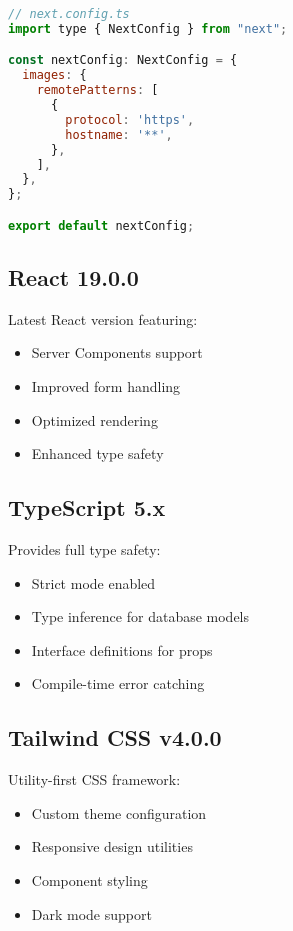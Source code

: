 \documentclass[12pt,a4paper]{report}
\begin{document}
\begin{lstlisting}[language=JavaScript, caption=Next.js Configuration]
// next.config.ts
import type { NextConfig } from "next";

const nextConfig: NextConfig = {
  images: {
    remotePatterns: [
      {
        protocol: 'https',
        hostname: '**',
      },
    ],
  },
};

export default nextConfig;
\end{lstlisting}

\subsection{React 19.0.0}

Latest React version featuring:
\begin{itemize}
    \item Server Components support
    \item Improved form handling
    \item Optimized rendering
    \item Enhanced type safety
\end{itemize}

\subsection{TypeScript 5.x}

Provides full type safety:
\begin{itemize}
    \item Strict mode enabled
    \item Type inference for database models
    \item Interface definitions for props
    \item Compile-time error catching
\end{itemize}

\subsection{Tailwind CSS v4.0.0}

Utility-first CSS framework:
\begin{itemize}
    \item Custom theme configuration
    \item Responsive design utilities
    \item Component styling
    \item Dark mode support
\end{itemize}
\end{document}
